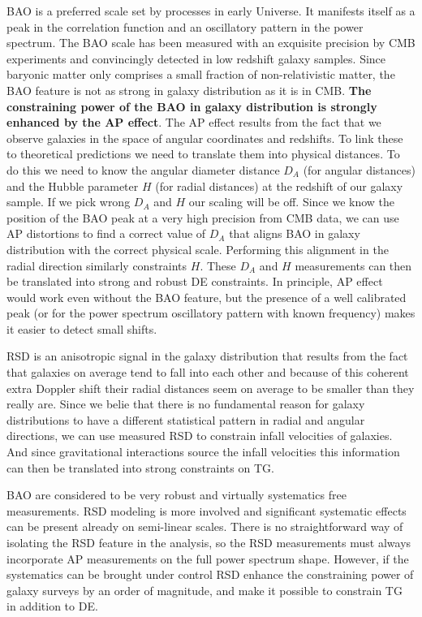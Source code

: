 BAO is a preferred scale set by processes in early Universe. It manifests
itself as a peak in the correlation function and an oscillatory pattern in the
power spectrum. The BAO scale has been measured with an exquisite precision by
CMB experiments and convincingly detected in low redshift galaxy samples. Since
baryonic matter only comprises a small fraction of non-relativistic matter, the
BAO feature is not as strong in galaxy distribution as it is in CMB. \textbf{The
constraining power of the BAO in galaxy distribution is strongly enhanced by
the AP effect}. The AP effect results from the fact that we observe galaxies in the space of
angular coordinates and redshifts. To link these  to theoretical  predictions
we need to translate them into physical distances. To do this we need to know
the angular diameter distance $D_A$ (for angular distances)  and the Hubble
parameter $H$ (for radial distances) at the redshift of our galaxy sample. If
we pick wrong $D_A$ and $H$ our scaling will be off. Since we know the
position of the BAO peak at a very high precision from CMB data, we can use AP
distortions to find a correct value of $D_A$ that aligns BAO in galaxy
distribution with the correct physical scale. Performing this alignment in the
radial direction similarly constraints $H$. These $D_A$ and $H$ measurements
can then be translated into strong and robust DE constraints. In principle, AP
effect would work even without the BAO feature, but the presence of a well
calibrated peak (or for the power spectrum oscillatory pattern with known
frequency) makes it easier to detect small shifts.

RSD is an anisotropic signal in the galaxy distribution that results from the
fact that galaxies on average tend to fall into each other and because of this
coherent extra Doppler shift their radial distances seem on average to be
smaller than they really are. Since we belie that there is no fundamental
reason for galaxy distributions to have a different statistical pattern in
radial and angular directions, we can use measured RSD to constrain infall
velocities of galaxies. And since gravitational interactions source the infall
velocities this information can then be translated into strong constraints on
TG.

BAO are considered to be very robust and virtually systematics free
measurements. RSD modeling is more involved and significant systematic effects
can be present already on semi-linear scales. There is no straightforward way
of isolating the RSD feature in the analysis, so the RSD measurements must
always incorporate AP measurements on the full power spectrum shape. However,
if the systematics can be brought under control RSD enhance the constraining
power of galaxy surveys by an order of magnitude, and make it possible to
constrain TG in addition to DE.

